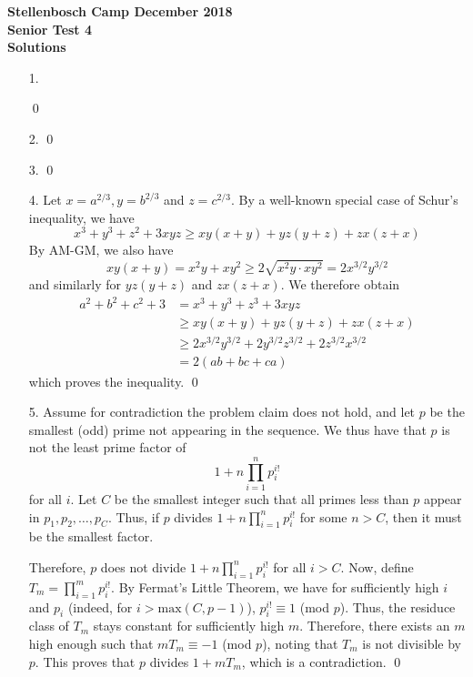 \documentclass[a4paper, 12pt]{article}
\begin{document}
\begin{center}
\textbf{Stellenbosch Camp December 2018 \\ Senior Test 4} \\
\textbf{Solutions}
\end{center}
\vspace{5mm}

\begin{enumerate}
    
\item[1.] 


\qed
\vspace{5mm}


\item[2.]
\qed


\item[3.]
 \qed
\vspace{5mm}

\item[4.]  Let $x = a^{2/3}, y = b^{2/3}$ and $z = c^{2/3}$. By a well-known special case of Schur's inequality, we have
\begin{equation*}
    x^3  + y^3 + z^2 + 3xyz \geq xy(x+y) + yz(y+z) + zx(z+x)
\end{equation*}
By AM-GM, we also have
\begin{equation*}
    xy(x+y) = x^2y + xy^2 \geq 2 \sqrt{x^2 y \cdot xy^2} = 2 x^{3/2} y^{3/2}
\end{equation*}
and similarly for $yz(y+z)$ and $zx(z+x)$. We therefore obtain
\begin{align*}
    a^2 + b^2 + c^2 + 3 &= x^3 + y^3 + z^3 + 3xyz \\
    &\geq xy(x+y) + yz(y+z) + zx(z+x) \\
    &\geq 2 x^{3/2} y^{3/2} + 2 y^{3/2} z^{3/2} + 2 z^{3/2} x^{3/2} \\
    &= 2(ab + bc + ca)
\end{align*}
which proves the inequality. \qed
\vspace{5mm}

\item[5.]  Assume for contradiction the problem claim does not hold, and let $p$ be the smallest (odd) prime not appearing in the sequence. We thus have that $p$ is not the least prime factor of 
$$1 + n \prod_{i=1}^n p_i^{i!}$$
for all $i$. Let $C$ be the smallest integer such that all primes less than $p$ appear in $p_1, p_2, \dots, p_C$. Thus, if $p$ divides $1 + n \prod_{i=1}^n p_i^{i!}$ for some $n > C$, then it must be the smallest factor.

Therefore, $p$ does not divide $1 + n \prod_{i=1}^n p_i^{i!}$ for all $i > C$. Now, define $T_m = \prod_{i=1}^m p_i^{i!}$. By Fermat's Little Theorem, we have for sufficiently high $i$ and $p_i$ (indeed, for $i > \textrm{max}(C, p-1)$), $p_i^{i!} \equiv 1$ (mod $p$). Thus, the residuce class of $T_m$ stays constant for sufficiently high $m$. Therefore, there exists an $m$ high enough such that $m T_m \equiv -1$ (mod $p$), noting that $T_m$ is not divisible by $p$. This proves that $p$ divides $1 + m T_m$, which is a contradiction. \qed


    

\end{enumerate}
\end{document}
